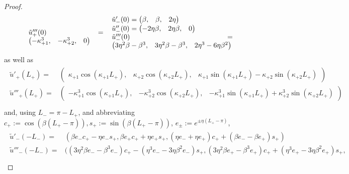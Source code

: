 \documentclass[10pt,a4paper]{amsart}
\begin{document}
\begin{proof}
\begin{equation}
\begin{tabular}{p{0.31\linewidth} p{0.5\linewidth}}
{					$\tilde{u}'''_+(0) = \begin{pmatrix}
						-\kappa_{+1}^3, & -\kappa_{+2}^3, & 0 
					\end{pmatrix}$
				}&
				\parbox{\linewidth}{$\tilde{u}'_-(0) = \begin{pmatrix}
						\beta, & \beta, & 2\eta
					\end{pmatrix}$ \\
					$\tilde{u}''_-(0) = \begin{pmatrix}
						-2 \eta \beta, & 2 \eta \beta, & 0
					\end{pmatrix}$ \\
					$\tilde{u}'''_-(0) = \begin{pmatrix}
						3 \eta^2 \beta - \beta^3, & 3 \eta^2 \beta - \beta^3, & 2 \eta^3 -6 \eta \beta^2
					\end{pmatrix}$
				}	
			\end{tabular}
		\end{equation}
		as well as  
		\begin{align}
			\begin{split}
				\tilde{u}'_+(L_+) =& \begin{pmatrix}
					\kappa_{+1} \cos(\kappa_{+1} L_+), & \kappa_{+2} \cos(\kappa_{+2} L_+), & \kappa_{+1} \sin(\kappa_{+1} L_+) - \kappa_{+2} \sin(\kappa_{+2} L_+)
				\end{pmatrix} \\
				\tilde{u}'''_+(L_+) =& \begin{pmatrix}
					-\kappa_{+1}^3 \cos(\kappa_{+1} L_+), & -\kappa_{+2}^3 \cos(\kappa_{+2} L_+), & -\kappa_{+1}^3 \sin(\kappa_{+1} L_+) + \kappa_{+2}^3 \sin(\kappa_{+2} L_+)
				\end{pmatrix} \\
			\end{split}
		\end{align}
		and, using $L_- = \pi - L_+$, and abbreviating $c_+:=\cos (\beta(L_+ - \pi)), s_+:=\sin (\beta(L_+ - \pi))$, $e_\pm:=e^{\pm\eta (L_+ - \pi)}$, 
		\begin{align}
			\begin{split}
				\tilde{u}'_-(-L_-) =&\left(\beta e_- c_+-\eta e_- s_+, 
				 \beta e_+ c_++\eta e_+ s_+, 
				 (\eta e_-  +\eta e_+) c_+ + (\beta e_-  -\beta e_+) s_+\right) \\
				\tilde{u}'''_-(-L_-) =& \big(
				(3\eta^2 \beta e_-  - \beta^3 e_-) c_+ - ( \eta^3 e_-  - 3\eta \beta^2 e_-) s_+, 
				(3\eta^2 \beta e_+  -\beta^3 e_+) c_+ + (\eta^3 e_+ - 3\eta \beta^2 e_+) s_+,\\

\end{split}
\end{align}
\end{proof}
\end{document}
